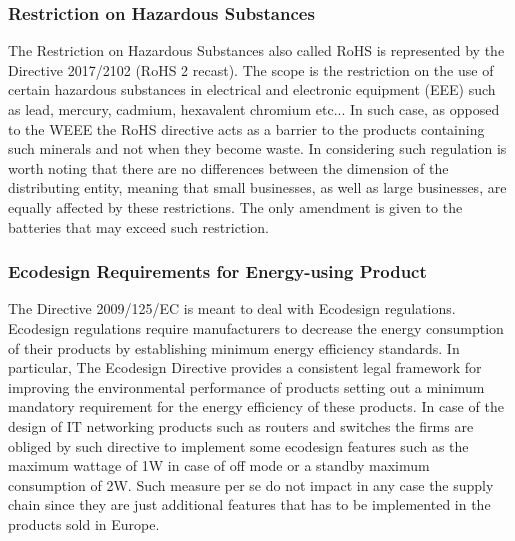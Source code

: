 \documentclass{article}
\begin{document}
\subsubsection{Restriction on Hazardous Substances}
  The Restriction on Hazardous Substances also called RoHS is represented by the Directive 2017/2102 (RoHS 2 recast). The scope is the restriction on the use of certain hazardous substances in electrical and electronic equipment (EEE) such as lead, mercury, cadmium, hexavalent chromium etc... In such case, as opposed to the WEEE the RoHS directive acts as a barrier to the products containing such minerals and not when they become waste. In considering such regulation is worth noting that there are no differences between the dimension of the distributing entity, meaning that small businesses, as well as large businesses, are equally affected by these restrictions. The only amendment is given to the batteries that may exceed such restriction.

\subsubsection{Ecodesign Requirements for Energy-using Product}
  The Directive 2009/125/EC is meant to deal with Ecodesign regulations. Ecodesign regulations require manufacturers to decrease the energy consumption of their products by establishing minimum energy efficiency standards. In particular, The Ecodesign Directive provides a consistent legal framework for improving the environmental performance of products setting out a minimum mandatory requirement for the energy efficiency of these products. In case of the design of IT networking products such as routers and switches the firms are obliged by such directive to implement some ecodesign features such as the maximum wattage of 1W in case of off mode or a standby maximum consumption of 2W. Such measure per se do not impact in any case the supply chain since they are just additional features that has to be implemented in the products sold in Europe.

\pagebreak 
\end{document}
